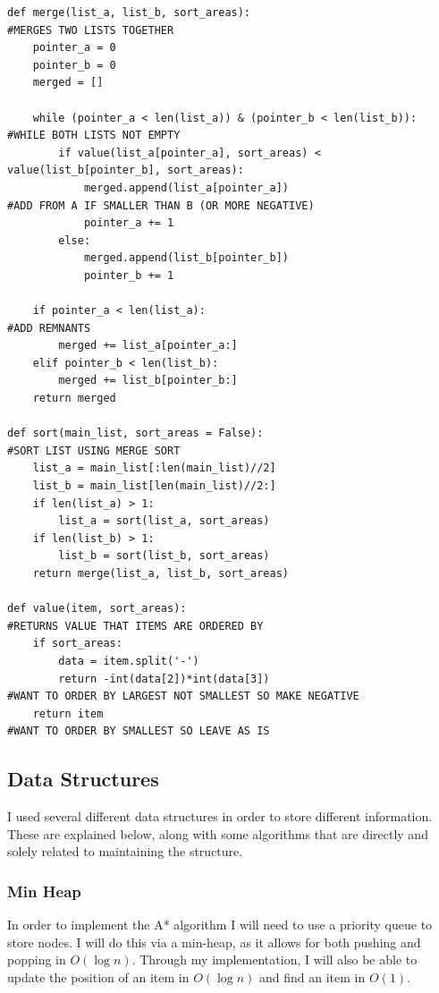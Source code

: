 \documentclass[titlepage]{article}
\begin{document}
\begin{changemargin}{-1in}{-1in} 
\begin{verbatim}
def merge(list_a, list_b, sort_areas):                                          #MERGES TWO LISTS TOGETHER
    pointer_a = 0
    pointer_b = 0
    merged = []

    while (pointer_a < len(list_a)) & (pointer_b < len(list_b)):                #WHILE BOTH LISTS NOT EMPTY
        if value(list_a[pointer_a], sort_areas) < value(list_b[pointer_b], sort_areas):
            merged.append(list_a[pointer_a])                                    #ADD FROM A IF SMALLER THAN B (OR MORE NEGATIVE)
            pointer_a += 1
        else:
            merged.append(list_b[pointer_b])
            pointer_b += 1

    if pointer_a < len(list_a):                                                 #ADD REMNANTS
        merged += list_a[pointer_a:]
    elif pointer_b < len(list_b):
        merged += list_b[pointer_b:]
    return merged

def sort(main_list, sort_areas = False):                                        #SORT LIST USING MERGE SORT
    list_a = main_list[:len(main_list)//2]
    list_b = main_list[len(main_list)//2:]
    if len(list_a) > 1:
        list_a = sort(list_a, sort_areas)
    if len(list_b) > 1:
        list_b = sort(list_b, sort_areas)
    return merge(list_a, list_b, sort_areas)   

def value(item, sort_areas):                                                    #RETURNS VALUE THAT ITEMS ARE ORDERED BY
    if sort_areas:
        data = item.split('-')
        return -int(data[2])*int(data[3])                                       #WANT TO ORDER BY LARGEST NOT SMALLEST SO MAKE NEGATIVE
    return item                                                                 #WANT TO ORDER BY SMALLEST SO LEAVE AS IS
\end{verbatim}
\end{changemargin} 


\subsection{Data Structures}
I used several different data structures in order to store different information. These are explained below, along with some algorithms that are directly and solely related to maintaining the structure.

\subsubsection{Min Heap}
In order to implement the A* algorithm I will need to use a priority queue to store nodes. I will do this via a min-heap, as it allows for both pushing and popping in $O(\log n)$. Through my implementation, I will also be able to update the position of an item in $O(\log n)$ and find an item in $O(1)$.
\end{document}
